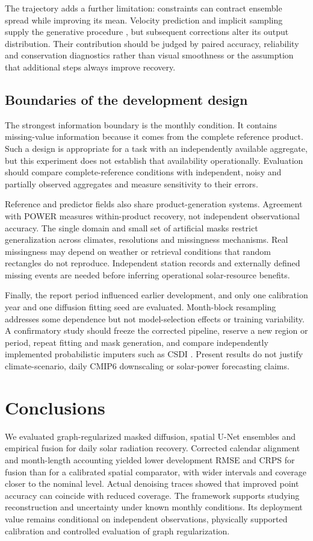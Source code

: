 \documentclass[preprint,12pt,authoryear]{elsarticle}
\begin{document}
The trajectory adds a further limitation: constraints can contract ensemble spread while improving its mean. Velocity prediction and implicit sampling supply the generative procedure \citep{ho2020,song2021,salimans2022}, but subsequent corrections alter its output distribution. Their contribution should be judged by paired accuracy, reliability and conservation diagnostics rather than visual smoothness or the assumption that additional steps always improve recovery.

\subsection{Boundaries of the development design}
The strongest information boundary is the monthly condition. It contains missing-value information because it comes from the complete reference product. Such a design is appropriate for a task with an independently available aggregate, but this experiment does not establish that availability operationally. Evaluation should compare complete-reference conditions with independent, noisy and partially observed aggregates and measure sensitivity to their errors.

Reference and predictor fields also share product-generation systems. Agreement with POWER measures within-product recovery, not independent observational accuracy. The single domain and small set of artificial masks restrict generalization across climates, resolutions and missingness mechanisms. Real missingness may depend on weather or retrieval conditions that random rectangles do not reproduce. Independent station records and externally defined missing events are needed before inferring operational solar-resource benefits.

Finally, the report period influenced earlier development, and only one calibration year and one diffusion fitting seed are evaluated. Month-block resampling addresses some dependence but not model-selection effects or training variability. A confirmatory study should freeze the corrected pipeline, reserve a new region or period, repeat fitting and mask generation, and compare independently implemented probabilistic imputers such as CSDI \citep{tashiro2021}. Present results do not justify climate-scenario, daily CMIP6 downscaling or solar-power forecasting claims.

\section{Conclusions}
We evaluated graph-regularized masked diffusion, spatial U-Net ensembles and empirical fusion for daily solar radiation recovery. Corrected calendar alignment and month-length accounting yielded lower development RMSE and CRPS for fusion than for a calibrated spatial comparator, with wider intervals and coverage closer to the nominal level. Actual denoising traces showed that improved point accuracy can coincide with reduced coverage. The framework supports studying reconstruction and uncertainty under known monthly conditions. Its deployment value remains conditional on independent observations, physically supported calibration and controlled evaluation of graph regularization.
\end{document}
